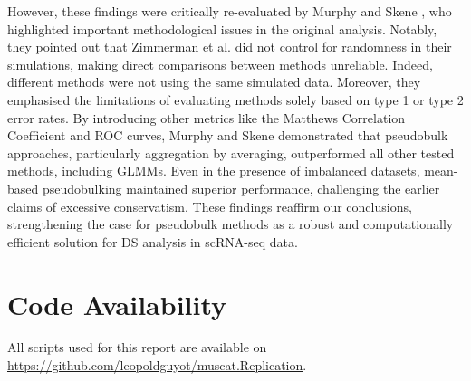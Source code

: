 \documentclass[a4paper, 11pt, twocolumn]{article}
\begin{document}
\begin{multicols}{2}
However, these findings were critically re-evaluated by Murphy and Skene \citep{murphy2022balanced}, who highlighted important methodological issues in the original analysis. Notably, they pointed out that Zimmerman et al. did not control for randomness in their simulations, making direct comparisons between methods unreliable. Indeed, different methods were not using the same simulated data. Moreover, they emphasised the limitations of evaluating methods solely based on type 1 or type 2 error rates. By introducing other metrics like the Matthews Correlation Coefficient and ROC curves, Murphy and Skene demonstrated that pseudobulk approaches, particularly aggregation by averaging, outperformed all other tested methods, including GLMMs. Even in the presence of imbalanced datasets, mean-based pseudobulking maintained superior performance, challenging the earlier claims of excessive conservatism. These findings reaffirm our conclusions, strengthening the case for pseudobulk methods as a robust and computationally efficient solution for DS analysis in scRNA-seq data.

\section*{Code Availability}

All scripts used for this report are available on \url{https://github.com/leopoldguyot/muscat.Replication}.

\pagebreak

\end{multicols}
\end{document}
